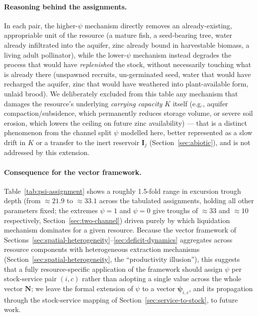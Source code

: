 \documentclass[twocolumn,10pt]{article}
\begin{document}
\paragraph{Reasoning behind the assignments.} In each pair, the higher-$\psi$ mechanism directly removes an already-existing, appropriable unit of the resource (a mature fish, a seed-bearing tree, water already infiltrated into the aquifer, zinc already bound in harvestable biomass, a living adult pollinator), while the lower-$\psi$ mechanism instead degrades the process that would have \emph{replenished} the stock, without necessarily touching what is already there (unspawned recruits, un-germinated seed, water that would have recharged the aquifer, zinc that would have weathered into plant-available form, unlaid brood). We deliberately excluded from this table any mechanism that damages the resource's underlying \emph{carrying capacity} $K$ itself (e.g., aquifer compaction/subsidence, which permanently reduces storage volume, or severe soil erosion, which lowers the ceiling on future zinc availability) — that is a distinct phenomenon from the channel split $\psi$ modelled here, better represented as a slow drift in $K$ or a transfer to the inert reservoir $\mathbf I_j$ (Section~\ref{sec:abiotic}), and is not addressed by this extension.

\paragraph{Consequence for the vector framework.} Table~\ref{tab:psi-assignment} shows a roughly 1.5-fold range in excursion trough depth (from $\approx21.9$ to $\approx33.1$ across the tabulated assignments, holding all other parameters fixed; the extremes $\psi=1$ and $\psi=0$ give troughs of $\approx33$ and $\approx10$ respectively, Section~\ref{sec:two-channel}) driven purely by which liquidation mechanism dominates for a given resource. Because the vector framework of Sections~\ref{sec:spatial-heterogeneity}--\ref{sec:deficit-dynamics} aggregates across resource components with heterogeneous extraction mechanisms (Section~\ref{sec:spatial-heterogeneity}, the ``productivity illusion''), this suggests that a fully resource-specific application of the framework should assign $\psi$ per stock-service pair $(i,c)$ rather than adopting a single value across the whole vector $\mathbf N$; we leave the formal extension of $\psi$ to a vector $\boldsymbol\psi_{i,c}$, and its propagation through the stock-service mapping of Section~\ref{sec:service-to-stock}, to future work.
\end{document}
